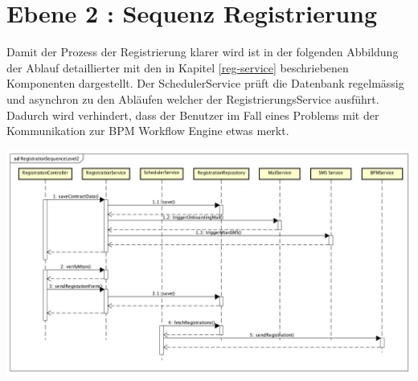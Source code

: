 \section{Ebene 2 : Sequenz Registrierung}

Damit der Prozess der Registrierung klarer wird ist in der folgenden Abbildung der Ablauf detaillierter mit den in Kapitel \ref{reg-service} beschriebenen Komponenten dargestellt. Der SchedulerService prüft die Datenbank regelmässig und asynchron zu den Abläufen welcher der RegistrierungsService ausführt. Dadurch wird verhindert, dass der Benutzer im Fall eines Problems mit der Kommunikation zur BPM Workflow Engine etwas merkt.

\begin{center}
	\includegraphics[scale=0.42]{RegistrationSequenceLevel2.png}
\end{center}



